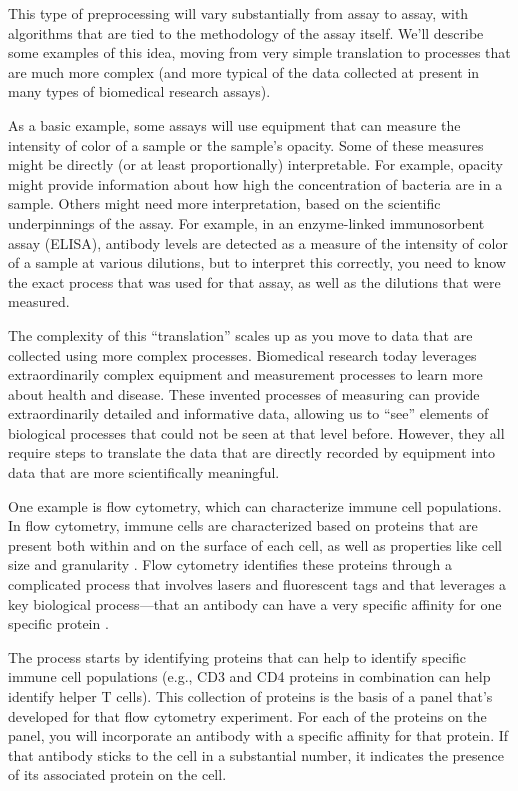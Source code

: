 \documentclass[]{tufte-book}
\begin{document}
This type of preprocessing will vary substantially from assay to assay, with
algorithms that are tied to the methodology of the assay itself. We'll describe
some examples of this idea, moving from very simple translation to processes
that are much more complex (and more typical of the data collected at present in
many types of biomedical research assays).

As a basic example, some assays will use equipment that can measure the
intensity of color of a sample or the sample's opacity. Some of these measures
might be directly (or at least proportionally) interpretable. For example,
opacity might provide information about how high the concentration of bacteria
are in a sample. Others might need more interpretation, based on the scientific
underpinnings of the assay. For example, in an enzyme-linked immunosorbent assay
(ELISA), antibody levels are detected as a measure of the intensity of color of
a sample at various dilutions, but to interpret this correctly, you need to know
the exact process that was used for that assay, as well as the dilutions that
were measured.

The complexity of this ``translation'' scales up as you move to data that are
collected using more complex processes. Biomedical research today leverages
extraordinarily complex equipment and measurement processes to learn more about
health and disease. These invented processes of measuring can
provide extraordinarily detailed and informative data, allowing us to ``see''
elements of biological processes that could not be seen at that level before.
However, they all require steps to translate the data that are directly
recorded by equipment into data that are more scientifically meaningful.

One example is flow cytometry, which can characterize immune cell populations.
In flow cytometry, immune cells are characterized based on proteins that are
present both within and on the surface of each cell, as well as properties like
cell size and granularity \citep[\citet{barnett2008cd4}]{maecker2012standardizing}. Flow
cytometry identifies these proteins through a complicated process that involves
lasers and fluorescent tags and that leverages a key biological process---that
an antibody can have a very specific affinity for one specific protein
\citep{barnett2008cd4}.

The process starts by identifying proteins that can help to
identify specific immune cell populations (e.g., CD3 and CD4 proteins in
combination can help identify helper T cells). This collection of proteins is
the basis of a panel that's developed for that flow cytometry experiment. For
each of the proteins on the panel, you will incorporate an antibody with a
specific affinity for that protein. If that antibody sticks to the cell in a
substantial number, it indicates the presence of its associated protein on the
cell.
\end{document}
